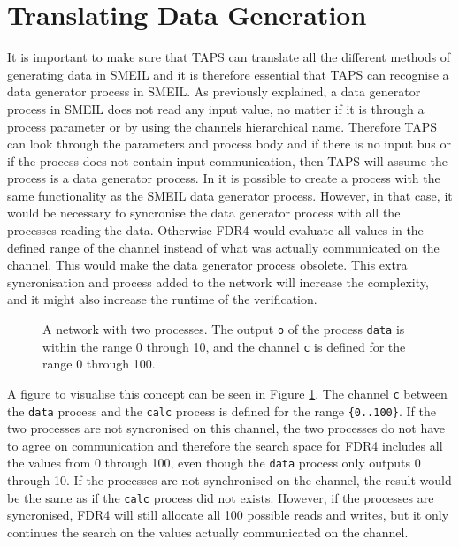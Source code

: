 \section{Translating Data Generation}
It is important to make sure that TAPS can translate all the different methods of generating data in SMEIL and it is therefore essential that TAPS can recognise a data generator process in SMEIL. As previously explained, a data generator process in SMEIL does not read any input value, no matter if it is through a process parameter or by using the channels hierarchical name. Therefore TAPS can look through the parameters and process body and if there is no input bus or if the process does not contain input communication, then TAPS will assume the process is a data generator process. In \cspm{} it is possible to create a process with the same functionality as the SMEIL data generator process. However, in that case, it would be necessary to syncronise the data generator process with all the processes reading the data. Otherwise FDR4 would evaluate all values in the defined range of the channel instead of what was actually communicated on the channel. This would make the data generator process obsolete. This extra syncronisation and process added to the \cspm{} network will increase the complexity, and it might also increase the runtime of the verification.
\begin{figure}
    \centering
    \caption{A \cspm{} network with two processes. The output \texttt{o} of the process \texttt{data} is within the range 0 through 10, and the channel \texttt{c} is defined for the range 0 through 100.}
    \label{fig:csp_data_generator_process}
\end{figure}
A figure to visualise this concept can be seen in Figure \ref{fig:csp_data_generator_process}. The channel \texttt{c} between the \texttt{data} process and the \texttt{calc} process is defined for the range \texttt{\{0..100\}}. If the two processes are not syncronised on this channel, the two processes do not have to agree on communication and therefore the search space for FDR4 includes all the values from 0 through 100, even though the \texttt{data} process only outputs 0 through 10. If the processes are not synchronised on the channel, the result would be the same as if the \texttt{calc} process did not exists. However, if the processes are syncronised, FDR4 will still allocate all 100 possible reads and writes, but it only continues the search on the values actually communicated on the channel.
